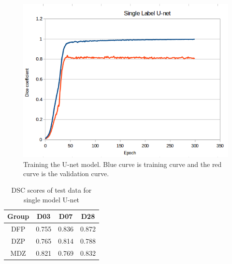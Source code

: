     
\begin{figure}[tbh]
\centering
\includegraphics[width=\textwidth]{results/train_results_single_unet.png}
\caption{Training the U-net model. Blue curve is training curve and the red curve is the validation curve. }
\label{fig:results_single_unet_train}
\end{figure}

\begin{table}[tbh]
\renewcommand{\arraystretch}{1}
\centering
\begin{tabular}{|c|c|c|c|}
\hline
\textbf{Group} & \textbf{D03}& \textbf{D07}& \textbf{D28}\\
\hline
DFP & 0.755 & 0.836 & 0.872\\      
\hline
DZP & 0.765 & 0.814 & 0.788\\
\hline
MDZ & 0.821 & 0.769 & 0.832\\ 
\hline
\end{tabular}
\caption{DSC scores of test data for single model U-net}
\label{tab.single_model_results_Unet}
\end{table}



